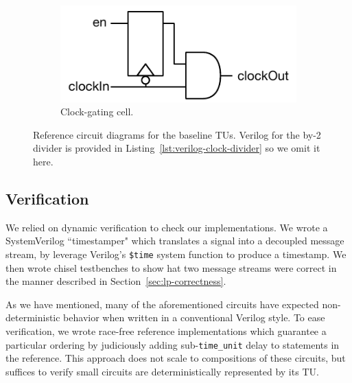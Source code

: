 \begin{figure}
\begin{subfigure}[t]{0.40\textwidth}
    \end{subfigure}
    \hspace{-1cm}
    \begin{subfigure}[t]{0.30\textwidth}
        \captionsetup{margin=0.25cm}
        \includegraphics[width=\columnwidth]{figures/clock-gate.pdf}
        \caption{Clock-gating cell.}
        \label{fig:clock-gate}
    \end{subfigure}
    \centering
    \caption{Reference circuit diagrams for the baseline TUs. Verilog for the
    by-2 divider is provided in Listing~\ref{lst:verilog-clock-divider} so we
    omit it here.}
    \label{fig:baseline-reference-circuits}
\end{figure}

\subsection{Verification}

We relied on dynamic verification to check our implementations. We
wrote a SystemVerilog ``timestamper" which translates a signal into a decoupled
message stream, by leverage Verilog's \texttt{\$time} system function to
produce a timestamp. We then wrote chisel testbenches to show hat two message
streams were correct in the manner described in
Section~\ref{sec:lp-correctness}.

As we have mentioned, many of the aforementioned circuits have expected
non-deterministic behavior when written in a conventional Verilog style. To
ease verification, we wrote race-free reference implementations which guarantee
a particular ordering by judiciously adding sub-\texttt{time\_unit} delay to
statements in the reference. This approach does not scale to compositions
of these circuits, but suffices to verify small circuits are
deterministically represented by its TU.

